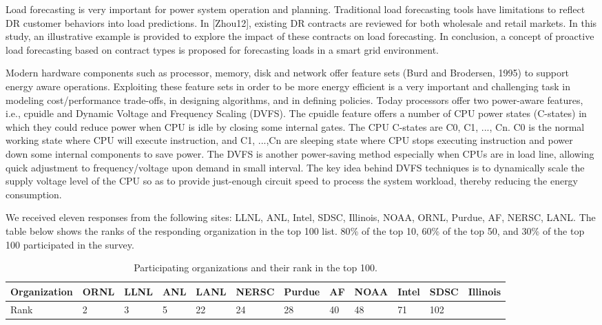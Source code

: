 Load forecasting is very important for power system operation and planning.
Traditional load forecasting tools have limitations to reflect DR customer
behaviors into load predictions. In [Zhou12], existing DR contracts are
reviewed for both wholesale and retail markets. In this study, an
illustrative example is provided to explore the impact of these contracts on
load forecasting. In conclusion, a concept of proactive load forecasting
based on contract types is proposed for forecasting loads in a smart grid
environment.

Modern hardware components such as processor, memory, disk and network offer
feature sets (Burd and Brodersen, 1995) to support energy aware operations.
Exploiting these feature sets in order to be more energy efficient is a very
important and challenging task in modeling cost/performance trade-offs, in
designing algorithms, and in defining policies. Today processors offer two
power-aware features, i.e., cpuidle and Dynamic Voltage and Frequency
Scaling (DVFS). The cpuidle feature offers a number of CPU power states
(C-states) in which they could reduce power when CPU is idle by closing some
internal gates. The CPU C-states are C0, C1, ..., Cn. C0 is the normal
working state where CPU will execute instruction, and C1, ...,Cn are
sleeping state where CPU stops executing instruction and power down some
internal components to save power. The DVFS is another power-saving method
especially when CPUs are in load line, allowing quick adjustment to
frequency/voltage upon demand in small interval. The key idea behind DVFS
techniques is to dynamically scale the supply voltage level of the CPU so as
to provide just-enough circuit speed to process the system workload, thereby
reducing the energy consumption.

We received eleven responses from the following sites: LLNL, ANL, Intel,
SDSC, Illinois, NOAA, ORNL, Purdue, AF, NERSC, LANL. The table below shows
the ranks of the responding organization in the top 100 list. 80{\%} of the
top 10, 60{\%} of the top 50, and 30{\%} of the top 100 participated in the
survey.


\begin{table}[htbp]
\begin{center}
\caption{Participating organizations and their rank in the top 100.}
\begin{tabular}{|p{59pt}|l|l|l|l|l|l|l|l|l|l|l|}
\hline
Organization&
ORNL&
LLNL&
ANL&
LANL&
NERSC&
Purdue&
AF&
NOAA&
Intel&
SDSC&
Illinois \\
\hline
Rank&
2&
3&
5&
22&
24&
28&
40&
48&
71&
102&
 \\
\hline
\end{tabular}
\label{tab4}
\end{center}
\end{table}

